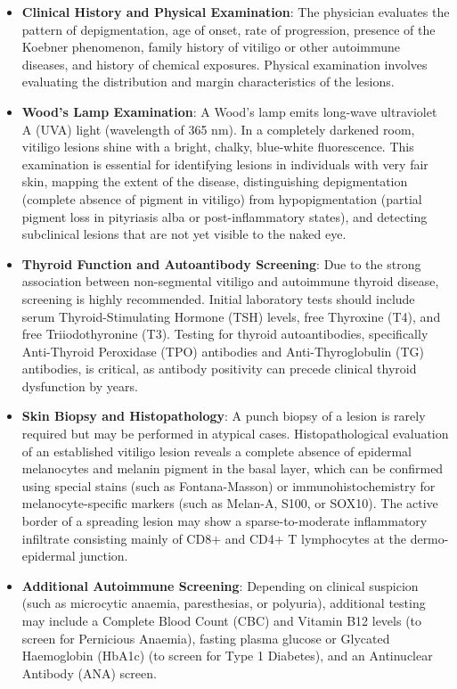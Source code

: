 \begin{itemize}
    \item \textbf{Clinical History and Physical Examination}: The physician evaluates the pattern of depigmentation, age of onset, rate of progression, presence of the Koebner phenomenon, family history of vitiligo or other autoimmune diseases, and history of chemical exposures. Physical examination involves evaluating the distribution and margin characteristics of the lesions.
    \item \textbf{Wood's Lamp Examination}: A Wood's lamp emits long-wave ultraviolet A (UVA) light (wavelength of 365 nm). In a completely darkened room, vitiligo lesions shine with a bright, chalky, blue-white fluorescence. This examination is essential for identifying lesions in individuals with very fair skin, mapping the extent of the disease, distinguishing depigmentation (complete absence of pigment in vitiligo) from hypopigmentation (partial pigment loss in pityriasis alba or post-inflammatory states), and detecting subclinical lesions that are not yet visible to the naked eye.
    \item \textbf{Thyroid Function and Autoantibody Screening}: Due to the strong association between non-segmental vitiligo and autoimmune thyroid disease, screening is highly recommended. Initial laboratory tests should include serum Thyroid-Stimulating Hormone (TSH) levels, free Thyroxine (T4), and free Triiodothyronine (T3). Testing for thyroid autoantibodies, specifically Anti-Thyroid Peroxidase (TPO) antibodies and Anti-Thyroglobulin (TG) antibodies, is critical, as antibody positivity can precede clinical thyroid dysfunction by years.
    \item \textbf{Skin Biopsy and Histopathology}: A punch biopsy of a lesion is rarely required but may be performed in atypical cases. Histopathological evaluation of an established vitiligo lesion reveals a complete absence of epidermal melanocytes and melanin pigment in the basal layer, which can be confirmed using special stains (such as Fontana-Masson) or immunohistochemistry for melanocyte-specific markers (such as Melan-A, S100, or SOX10). The active border of a spreading lesion may show a sparse-to-moderate inflammatory infiltrate consisting mainly of CD8+ and CD4+ T lymphocytes at the dermo-epidermal junction.
    \item \textbf{Additional Autoimmune Screening}: Depending on clinical suspicion (such as microcytic anaemia, paresthesias, or polyuria), additional testing may include a Complete Blood Count (CBC) and Vitamin B12 levels (to screen for Pernicious Anaemia), fasting plasma glucose or Glycated Haemoglobin (HbA1c) (to screen for Type 1 Diabetes), and an Antinuclear Antibody (ANA) screen.
\end{itemize}

